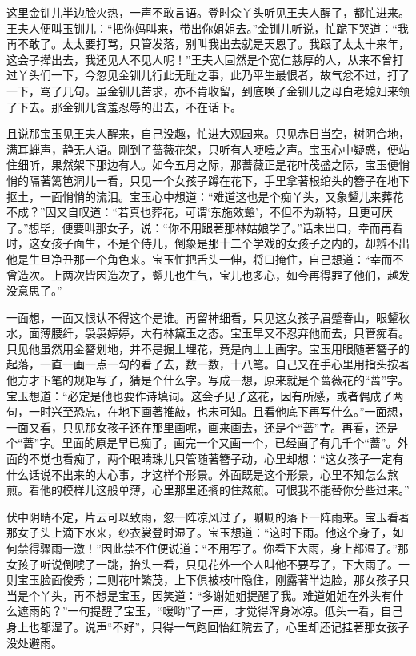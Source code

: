 \begin{parag}
    这里金钏儿半边脸火热，一声不敢言语。登时众丫头听见王夫人醒了，都忙进来。王夫人便叫玉钏儿：“把你妈叫来，带出你姐姐去。”金钏儿听说，忙跪下哭道：“我再不敢了。太太要打骂，只管发落，别叫我出去就是天恩了。我跟了太太十来年，这会子撵出去，我还见人不见人呢！”王夫人固然是个宽仁慈厚的人，从来不曾打过丫头们一下，今忽见金钏儿行此无耻之事，此乃平生最恨者，故气忿不过，打了一下，骂了几句。虽金钏儿苦求，亦不肯收留，到底唤了金钏儿之母白老媳妇来领了下去。那金钏儿含羞忍辱的出去，不在话下。
\end{parag}


\begin{parag}
    且说那宝玉见王夫人醒来，自己没趣，忙进大观园来。只见赤日当空，树阴合地，满耳蝉声，静无人语。刚到了蔷薇花架，只听有人哽噎之声。宝玉心中疑惑，便站住细听，果然架下那边有人。如今五月之际，那蔷薇正是花叶茂盛之际，宝玉便悄悄的隔著篱笆洞儿一看，只见一个女孩子蹲在花下，手里拿著根绾头的簪子在地下抠土，一面悄悄的流泪。宝玉心中想道：“难道这也是个痴丫头，又象颦儿来葬花不成？”因又自叹道：“若真也葬花，可谓‘东施效颦’，不但不为新特，且更可厌了。”想毕，便要叫那女子，说：“你不用跟著那林姑娘学了。”话未出口，幸而再看时，这女孩子面生，不是个侍儿，倒象是那十二个学戏的女孩子之内的，却辨不出他是生旦净丑那一个角色来。宝玉忙把舌头一伸，将口掩住，自己想道：“幸而不曾造次。上两次皆因造次了，颦儿也生气，宝儿也多心，如今再得罪了他们，越发没意思了。”
\end{parag}


\begin{parag}
    一面想，一面又恨认不得这个是谁。再留神细看，只见这女孩子眉蹙春山，眼颦秋水，面薄腰纤，袅袅婷婷，大有林黛玉之态。宝玉早又不忍弃他而去，只管痴看。只见他虽然用金簪划地，并不是掘土埋花，竟是向土上画字。宝玉用眼随著簪子的起落，一直一画一点一勾的看了去，数一数，十八笔。自己又在手心里用指头按著他方才下笔的规矩写了，猜是个什么字。写成一想，原来就是个蔷薇花的“蔷”字。宝玉想道：“必定是他也要作诗填词。这会子见了这花，因有所感，或者偶成了两句，一时兴至恐忘，在地下画著推敲，也未可知。且看他底下再写什么。”一面想，一面又看，只见那女孩子还在那里画呢，画来画去，还是个“蔷”字。再看，还是个“蔷”字。里面的原是早已痴了，画完一个又画一个，已经画了有几千个“蔷”。外面的不觉也看痴了，两个眼睛珠儿只管随著簪子动，心里却想：“这女孩子一定有什么话说不出来的大心事，才这样个形景。外面既是这个形景，心里不知怎么熬煎。看他的模样儿这般单薄，心里那里还搁的住熬煎。可恨我不能替你分些过来。”
\end{parag}


\begin{parag}
    伏中阴晴不定，片云可以致雨，忽一阵凉风过了，唰唰的落下一阵雨来。宝玉看著那女子头上滴下水来，纱衣裳登时湿了。宝玉想道：“这时下雨。他这个身子，如何禁得骤雨一激！”因此禁不住便说道：“不用写了。你看下大雨，身上都湿了。”那女孩子听说倒唬了一跳，抬头一看，只见花外一个人叫他不要写了，下大雨了。一则宝玉脸面俊秀；二则花叶繁茂，上下俱被枝叶隐住，刚露著半边脸，那女孩子只当是个丫头，再不想是宝玉，因笑道：“多谢姐姐提醒了我。难道姐姐在外头有什么遮雨的？”一句提醒了宝玉，“嗳哟”了一声，才觉得浑身冰凉。低头一看，自己身上也都湿了。说声“不好”，只得一气跑回怡红院去了，心里却还记挂著那女孩子没处避雨。
\end{parag}


